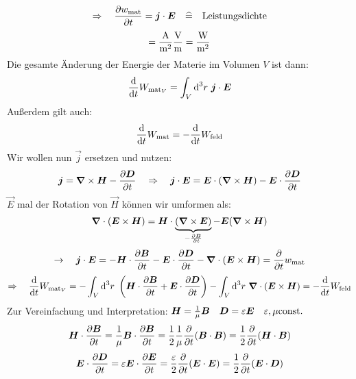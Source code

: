 \begin{equation*}
\Rightarrow \quad \frac{\partial w_{\textrm{mat}}}{\partial t} = \bm{j} \cdot \bm{E} \quad \widehat{=} \quad \textrm{Leistungsdichte}
\end{equation*}
\begin{equation*}
[\vec{j}] [\vec{E}] = \frac{\tx{A}}{\tx{m}^2} \frac{\tx{V}}{\tx{m}} = \frac{\tx{W}}{\tx{m}^2}
\end{equation*}
Die gesamte Änderung der Energie der Materie im Volumen $ V $ ist dann:
\begin{equation*}
\frac{\textrm{d} }{\textrm{d} t} W_{\textrm{mat}_V} = \int_V \textrm{d}^3 r \ \bm{j} \cdot \bm{E}
\end{equation*}
Außerdem gilt auch:
\begin{equation*}
\frac{\textrm{d} }{\textrm{d} t} W_{\textrm{mat}} = - \frac{\textrm{d} }{\textrm{d} t} W_{\textrm{feld}}
\end{equation*}
Wir wollen nun $ \vec{j} $ ersetzen und nutzen:
\begin{equation*}
\bm{j} = \bm{\nabla} \times \bm{H} - \frac{\partial \bm{D}}{\partial t} \quad \Rightarrow \quad \bm{j} \cdot \bm{E} = \bm{E} \cdot (\bm{\nabla} \times \bm{H}) - \bm{E} \cdot \frac{\partial \bm{D}}{\partial t}
\end{equation*}
$ \vec{E} $ mal der Rotation von $ \vec{H} $ können wir umformen als:
\begin{equation*}
\bm{\nabla} \cdot (\bm{E} \times \bm{H}) = \bm{H} \cdot \underbrace{(\bm{\nabla} \times \bm{E})}_{- \frac{\partial \bm{B}}{\partial t}} - \bm{E} (\bm{\nabla} \times \bm{H})
\end{equation*}
\begin{equation*}
\rightarrow \quad  \bm{j} \cdot \bm{E} = - \bm{H} \cdot \frac{\partial \bm{B}}{\partial t} - \bm{E} \cdot \frac{\partial \bm{D}}{\partial t} - \bm{\nabla} \cdot (\bm{E} \times \bm{H}) = \frac{\partial }{\partial t} w_{\textrm{mat}}
\end{equation*}
\begin{equation*}
\Rightarrow \quad \frac{\textrm{d} }{\textrm{d} t} W_{\textrm{mat}_V} = - \int_V \textrm{d}^3 r \ \left(\bm{H} \cdot \frac{\partial \bm{B}}{\partial t} + \bm{E} \cdot \frac{\partial \bm{D}}{\partial t} \right) - \int_V \textrm{d}^3 r \ \bm{\nabla} \cdot (\bm{E} \times \bm{H}) = - \frac{\textrm{d} }{\textrm{d} t} W_{\textrm{feld}}
\end{equation*}
Zur Vereinfachung und Interpretation: $ \bm{H} = \frac{1}{\mu} \bm{B} \quad \bm{D} = \varepsilon \bm{E} \quad \varepsilon, \mu \textrm{const.} $
\begin{equation*}
\bm{H} \cdot \frac{\partial \bm{B}}{\partial t} = \frac{1}{\mu} \bm{B} \cdot \frac{\partial \bm{B}}{\partial t} = \frac{1}{2} \frac{1}{\mu} \frac{\partial }{\partial t} (\bm{B} \cdot \bm{B}) = \frac{1}{2} \frac{\partial }{\partial t} (\bm{H} \cdot \bm{B})
\end{equation*}
\begin{equation*}
\bm{E} \cdot \frac{\partial \bm{D}}{\partial t} = \varepsilon \bm{E} \cdot \frac{\partial \bm{E}}{\partial t} = \frac{\varepsilon}{2} \frac{\partial }{\partial t} (\bm{E} \cdot \bm{E}) = \frac{1}{2} \frac{\partial }{\partial t} (\bm{E} \cdot \bm{D})
\end{equation*}

